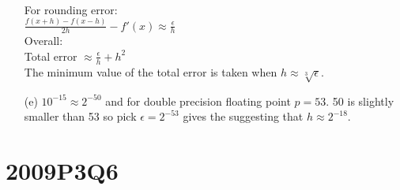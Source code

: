\documentclass[10pt,twoside,a4paper]{article}
\begin{document}
\begin{itemize}
\\For rounding error:
\\$\frac{f(x+h)-f(x-h)}{2h}-f'(x) \approx \frac{\epsilon}{h}$
\\Overall:
\\Total error $\approx \frac{\epsilon}{h} + h^2$ 
\\The minimum value of the total error is taken when $h\approx\sqrt[3]{\epsilon}$.
\item[(e)]
$10^{-15}\approx2^{-50}$ and for double precision floating point $p = 53$. 50 is slightly smaller than 53 so pick $\epsilon = 2^{-53}$ gives the suggesting that $h \approx 2^{-18}$. 
\end{itemize}
\section*{2009P3Q6}
\end{document}
